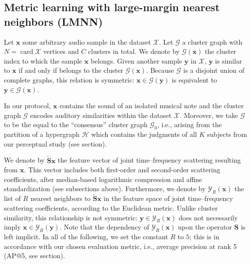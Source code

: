 \documentclass{bmcart}
\DeclareMathOperator*{\card}{card}
\newcommand{\lnameref}[1]{%
\bgroup
\let\nmu\MakeLowercase
\nameref{#1}\egroup}
\newcommand{\nmu}{}
\begin{document}
\subsection*{Metric learning with large-margin nearest neighbors (LMNN)}
Let $\boldsymbol{x}$ some arbitrary audio sample in the dataset $\mathcal{X}$.
Let $\mathcal{G}$ a cluster graph with $N = \card \mathcal{X}$ vertices and $C$ clusters in total.
We denote by $\mathcal{G}(\boldsymbol{x})$ the cluster index to which the sample $\boldsymbol{x}$ belongs.
Given another sample $\boldsymbol{y}$ in $\mathcal{X}$, $\boldsymbol{y}$ is similar to $\boldsymbol{x}$ if and only if belongs to the cluster $\mathcal{G}(\boldsymbol{x})$.
Because $\mathcal{G}$ is a disjoint union of complete graphs, this relation is symmetric: $\boldsymbol{x} \in \mathcal{G}(\boldsymbol{y})$ is equivalent to $\boldsymbol{y} \in \mathcal{G}(\boldsymbol{x})$.

In our protocol, $\boldsymbol{x}$ contains the sound of an isolated musical note and the cluster graph $\mathcal{G}$ encodes auditory similarities within the dataset $\mathcal{X}$.
Moreover, we take $\mathcal{G}$ to be the equal to the ``consensus'' cluster graph $\mathcal{G}_0$, i.e., arising from the partition of a hypergraph $\mathcal{H}$ which contains the judgments of all $K$ subjects from our perceptual study (see \lnameref{sec:data-collection} section).


We denote by $\mathbf{\widetilde{S}}\boldsymbol{x}$ the feature vector of joint time--frequency scattering resulting from $\boldsymbol{x}$.
This vector includes both first-order and second-order scattering coefficients, after median-based logarithmic compression and affine standardization (see subsections above).
Furthermore, we denote by $\mathcal{Y}_R (\boldsymbol{x})$ the list of $R$ nearest neighbors to $\mathbf{\widetilde{S}}\boldsymbol{x}$ in the feature space of joint time--frequency scattering coefficients, according to the Euclidean metric.
Unlike cluster similarity, this relationship is not symmetric: $\boldsymbol{y}\in\mathcal{Y}_R (\boldsymbol{x})$ does not necessarily imply $\boldsymbol{x}\in\mathcal{Y}_R (\boldsymbol{y})$.
Note that the dependency of $\mathcal{Y}_R (\boldsymbol{x})$ upon the operator $\mathbf{S}$ is left implicit.
In all of the following, we set the constant $R$ to $5$; this is in accordance with our chosen evaluation metric, i.e., average precision at rank 5 (AP@5, see \lnameref{sec:results} section).
\end{document}
